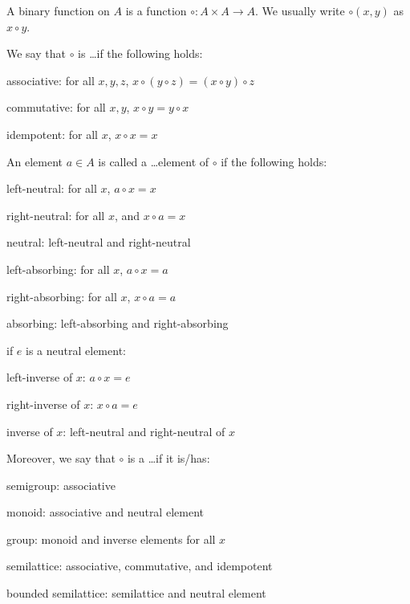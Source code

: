 A binary function on $A$ is a function $\circ: A\times A\to A$.
We usually write $\circ(x,y)$ as $x\circ y$.

\begin{definition}\label{def:math:binop}
We say that $\circ$ is \ldots if the following holds:
\begin{compactitem}
 \item associative: for all $x,y,z$, $x\circ(y\circ z)=(x\circ y)\circ z$
 \item commutative: for all $x,y$, $x\circ y=y\circ x$
 \item idempotent: for all $x$, $x\circ x=x$
\end{compactitem}

An element $a\in A$ is called a \ldots element of $\circ$ if the following holds:
 \begin{compactitem}
  \item left-neutral: for all $x$, $a\circ x=x$
  \item right-neutral: for all $x$, and $x\circ a=x$
  \item neutral: left-neutral and right-neutral
  \item left-absorbing: for all $x$, $a\circ x=a$
  \item right-absorbing: for all $x$, $x\circ a=a$
  \item absorbing: left-absorbing and right-absorbing
  \item if $e$ is a neutral element:
   \begin{compactitem}
     \item left-inverse of $x$: $a\circ x=e$
     \item right-inverse of $x$: $x\circ a=e$
     \item inverse of $x$: left-neutral and right-neutral of $x$
   \end{compactitem}
 \end{compactitem}
 
Moreover, we say that $\circ$ is a \ldots if it is/has:
\begin{compactitem}
 \item semigroup: associative
 \item monoid: associative and neutral element
 \item group: monoid and inverse elements for all $x$
 \item semilattice: associative, commutative, and idempotent
 \item bounded semilattice: semilattice and neutral element
\end{compactitem}
\end{definition}

